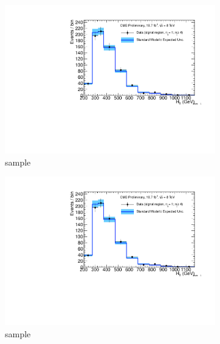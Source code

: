\begin{figure}[h!]
\begin{subfigure}[b]{0.48\textwidth}
    \includegraphics[width=\textwidth,page=4]
    {Figs/results/v0/blueBand/bestFit_2012dev_RQcdZero_fZinvAll_1b_ge4j-12hp_smOnly}
    \caption{\mj sample}
  \end{subfigure}
  \begin{subfigure}[b]{0.48\textwidth}
    \includegraphics[width=\textwidth,page=8]
    {Figs/results/v0/blueBand/bestFit_2012dev_RQcdZero_fZinvAll_1b_ge4j-12hp_smOnly}
    \caption{\mmj sample}
  \end{subfigure}\\
  \begin{subfigure}[b]{0.48\textwidth}

\end{subfigure}
\end{figure}
